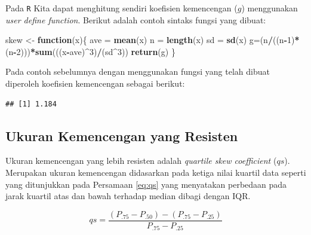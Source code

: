 \documentclass[]{book}
\newenvironment{Shaded}{\begin{snugshade}}{\end{snugshade}}
\newcommand{\KeywordTok}[1]{\textcolor[rgb]{0.13,0.29,0.53}{\textbf{#1}}}
\newcommand{\DecValTok}[1]{\textcolor[rgb]{0.00,0.00,0.81}{#1}}
\newcommand{\StringTok}[1]{\textcolor[rgb]{0.31,0.60,0.02}{#1}}
\newcommand{\ControlFlowTok}[1]{\textcolor[rgb]{0.13,0.29,0.53}{\textbf{#1}}}
\newcommand{\OperatorTok}[1]{\textcolor[rgb]{0.81,0.36,0.00}{\textbf{#1}}}
\newcommand{\NormalTok}[1]{#1}
\begin{document}
Pada \texttt{R} Kita dapat menghitung sendiri koefisien kemencengan
(\(g\)) menggunakan \emph{user define function}. Berikut adalah contoh
sintaks fungsi yang dibuat:

\begin{Shaded}
\begin{Highlighting}[]
\NormalTok{skew <-}\StringTok{ }\ControlFlowTok{function}\NormalTok{(x)\{}
\NormalTok{  ave =}\StringTok{ }\KeywordTok{mean}\NormalTok{(x)}
\NormalTok{  n =}\StringTok{ }\KeywordTok{length}\NormalTok{(x)}
\NormalTok{  sd =}\StringTok{ }\KeywordTok{sd}\NormalTok{(x)}
\NormalTok{  g=(n}\OperatorTok{/}\NormalTok{((n}\OperatorTok{-}\DecValTok{1}\NormalTok{)}\OperatorTok{*}\NormalTok{(n}\OperatorTok{-}\DecValTok{2}\NormalTok{)))}\OperatorTok{*}\KeywordTok{sum}\NormalTok{(((x}\OperatorTok{-}\NormalTok{ave)}\OperatorTok{^}\DecValTok{3}\NormalTok{)}\OperatorTok{/}\NormalTok{(sd}\OperatorTok{^}\DecValTok{3}\NormalTok{))}
  \KeywordTok{return}\NormalTok{(g)}
\NormalTok{\}}
\end{Highlighting}
\end{Shaded}

Pada contoh sebelumnya dengan menggunakan fungsi yang telah dibuat
diperoleh koefisien kemencengan sebagai berikut:

\begin{Shaded}
\end{Shaded}

\begin{verbatim}
## [1] 1.184
\end{verbatim}

\subsection{Ukuran Kemencengan yang
Resisten}\label{ukuran-kemencengan-yang-resisten}

Ukuran kemencengan yang lebih resisten adalah \emph{quartile skew
coefficient} (\(qs\)). Merupakan ukuran kemencengan didasarkan pada
ketiga nilai kuartil data seperti yang ditunjukkan pada Persamaan
\eqref{eq:qs} yang menyatakan perbedaan pada jarak kuartil atas dan bawah
terhadap median dibagi dengan IQR.

\begin{equation}
  qs=\frac{\left(P_{.75}-P_{.50}\right)-\left(P_{.75}-P_{.25}\right)}{P_{.75}-P_{.25}}
  \label{eq:qs}
\end{equation}
\end{document}
